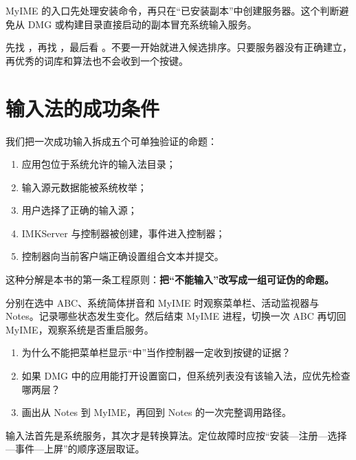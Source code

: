 MyIME 的入口先处理安装命令，再只在“已安装副本”中创建服务器。这个判断避免从 DMG 或构建目录直接启动的副本冒充系统输入服务。



\begin{sourcewalk}[阅读顺序]
先找 ，再找 ，最后看 。不要一开始就进入候选排序。只要服务器没有正确建立，再优秀的词库和算法也不会收到一个按键。
\end{sourcewalk}

\section{输入法的成功条件}

我们把一次成功输入拆成五个可单独验证的命题：

\begin{enumerate}
  \item 应用包位于系统允许的输入法目录；
  \item 输入源元数据能被系统枚举；
  \item 用户选择了正确的输入源；
  \item IMKServer 与控制器被创建，事件进入控制器；
  \item 控制器向当前客户端正确设置组合文本并提交。
\end{enumerate}

这种分解是本书的第一条工程原则：\textbf{把“不能输入”改写成一组可证伪的命题。}

\begin{lab}[观察系统状态]
分别在选中 ABC、系统简体拼音和 MyIME 时观察菜单栏、活动监视器与 Notes。记录哪些状态发生变化。然后结束 MyIME 进程，切换一次 ABC 再切回 MyIME，观察系统是否重启服务。
\end{lab}

\exercises
\begin{enumerate}
  \item 为什么不能把菜单栏显示“中”当作控制器一定收到按键的证据？
  \item 如果 DMG 中的应用能打开设置窗口，但系统列表没有该输入法，应优先检查哪两层？
  \item 画出从 Notes 到 MyIME，再回到 Notes 的一次完整调用路径。
\end{enumerate}

\begin{summarybox}
输入法首先是系统服务，其次才是转换算法。定位故障时应按“安装—注册—选择—事件—上屏”的顺序逐层取证。
\end{summarybox}


